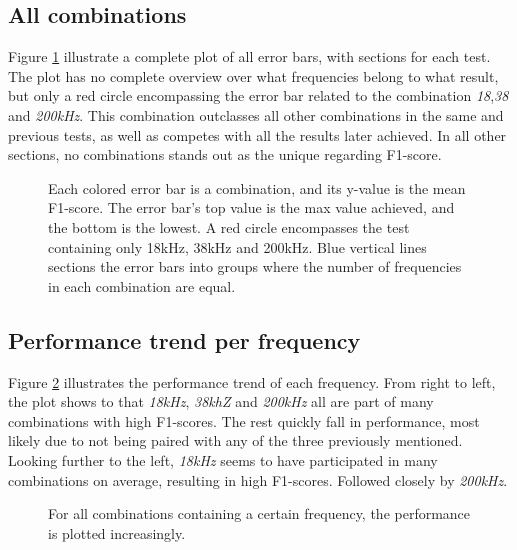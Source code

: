     \subsection{All combinations}
        Figure \ref{errorbar_fig} illustrate a complete plot of all error bars, with sections for each test. The plot has no complete overview over what frequencies belong to what result, but only a red circle encompassing the error bar related to the combination \textit{18},\textit{38} and \textit{200kHz}. This combination outclasses all other combinations in the same and previous tests, as well as competes with all the results later achieved. In all other sections, no combinations stands out as the unique regarding F1-score.
        
        \begin{figure}[H]
            \centering
            
            \caption[Error bar - combinations of 3 frequencies]{Each colored error bar is a combination, and its y-value is the mean F1-score. The error bar's top value is the max value achieved, and the bottom is the lowest. A red circle encompasses the test containing only 18kHz, 38kHz and 200kHz. Blue vertical lines sections the error bars into groups where the number of frequencies in each combination are equal.}
          	\medskip 
            \label{errorbar_fig}
        \end{figure}
        
        
        
    \subsection{Performance trend per frequency}
        Figure \ref{performance_trend_fig} illustrates the performance trend of each frequency. From right to left, the plot shows to that \textit{18kHz}, \textit{38khZ} and \textit{200kHz} all are part of many combinations with high F1-scores. The rest quickly fall in performance, most likely due to not being paired with any of the three previously mentioned. Looking further to the left, \textit{18kHz} seems to have participated in many combinations on average, resulting in high F1-scores. Followed closely by \textit{200kHz}.
        \begin{figure}[H]
            \centering
            
            \caption[Performance trend per frequency]{For all combinations containing a certain frequency, the performance is plotted increasingly.}
          	\medskip 
            \label{performance_trend_fig}
        \end{figure}
    

    
    
